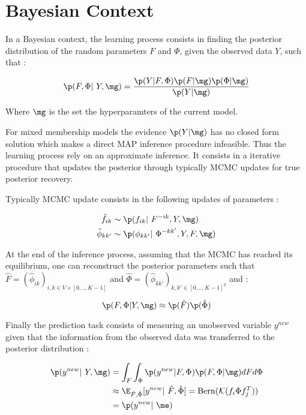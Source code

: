 \section{Bayesian Context}

In a Bayesian context, the learning process consists in finding the posterior distribution of the random parameters $F$ and $\Phi$, given the observed data $Y$, such that : 

\begin{equation}
    \p(F, \Phi | Y, \mg) = \frac{\p(Y|F,\Phi)\p(F|\mg)\p(\Phi|\mg)}{\p(Y|\mg)}
\end{equation}

Where $\mg$ is the set the hyperparamters of the current model.


For mixed membership models the evidence $\p(Y|\mg)$ has no closed form solution which makes a direct MAP inference procedure infeasible. Thus the learning process rely on an approximate inference. It consists in a iterative procedure that updates the posterior through typically MCMC updates for true posterior recovery.

Typically MCMC update consists in the following updates of parameters :  

\begin{align}
    \hat f_{ik} &\sim \p(f_{ik} | F^{-ik}, Y, \mg) \\
    \hat \phi_{kk'} &\sim \p(\phi_{kk'} | \Phi^{-kk'}, Y, F, \mg)
\end{align}

At the end of the inference process, assuming that the MCMC has reached its  equilibrium, one can reconstruct the posterior parameters such that $\hat F = (\hat \phi_{ik})_{i,k \in V\times[0,.., K-1]}$ and $\hat \Phi = (\hat \phi_{kk'})_{k,k' \in [0,.., K-1]^2}$ and :

\begin{equation}
    \p(F, \Phi|Y, \mg) \approx \p(\hat F) \p(\hat \Phi)
\end{equation}

Finally the prediction task consists of measuring an unobserved variable $y^{new}$ given that the information from the observed data was transferred to the posterior distribution : 

\begin{align*}
    \p(y^{new} | Y, \mg) &= \int_F \int_\Phi \p(y^{new}|F,\Phi) \p(F,\Phi|\mg) dF d\Phi \\
                          &\approx \E_{\hat F, \hat \Phi} [y^{new} | \hat F, \hat \Phi] = \mathrm{Bern}(\mathcal{K}(f_i \Phi f_j^T)) \\
                          &= \p(y^{new} | \me)
\end{align*}

